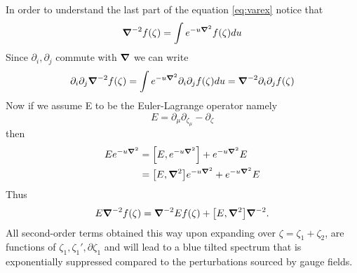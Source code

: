 \documentclass[12pt,a4paper]{article}
\numberwithin{equation}{section}
\numberwithin{equation}{section}
\begin{document}
In order to understand the last part of the equation \eqref{eq:varex} notice that 
\begin{equation}
    \grad^{-2} f(\zeta) = \int e^{-u \grad^2} f(\zeta) du
\end{equation}
Since $\partial_i, \partial_j$ commute with $\grad$ we can write 
\begin{equation}
  \partial_i \partial_j  \grad^{-2} f(\zeta) =    \int e^{-u \grad^2} \partial_i \partial_j f(\zeta) du = \grad^{-2} \partial_i \partial_j f(\zeta)
\end{equation}
Now if we assume E to be the Euler-Lagrange operator namely
\begin{equation}
   E= \partial_{\mu} \partial_{\zeta_{\mu}}-\partial_{\zeta}
\end{equation}
then
\begin{equation}
\begin{split}
    E e^{-u \grad^2} &= \comm{E}{e^{-u \grad^2}} + e^{-u \grad^2}E \\
    &= \comm{E}{\grad^2}  e^{-u \grad^2} + e^{-u \grad^2}E 
    \end{split}
\end{equation}
Thus
\begin{equation}
   E \grad^{-2} f(\zeta)  = \grad^{-2} E f(\zeta) + \comm{E}{\grad^2}  \grad^{-2}.
\end{equation}
All second-order terms obtained this way upon expanding over $\zeta=\zeta_1+\zeta_2$, are functions of $\zeta_1,\zeta_1',\partial \zeta_1$ and will lead to a blue tilted spectrum that is exponentially suppressed compared to the perturbations sourced by gauge fields. 
\end{document}
